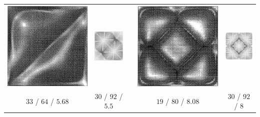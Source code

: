 \documentclass[compress,12pt]{beamer}
\begin{document}
\begin{frame}
\begin{tabular}{ccccc}
    \includegraphics[width=.2\textwidth]{figures/2cell_exp} &
    \includegraphics[width=.2\textwidth]{figures/2cell_AR5point5} &
    \hspace{.05\textwidth} &
    \includegraphics[width=.2\textwidth]{figures/5cell_exp} &
    \includegraphics[width=.2\textwidth]{figures/5cell_AR8} \\

    $33$  / $64$  / $5.68$ &
    $30$  / $92$  / $5.5$ &
    & %
    $19$  / $80$  / $8.08$ &
    $30$  / $92$  / $8$ \\
    

\end{tabular}
\end{frame}
\end{document}
